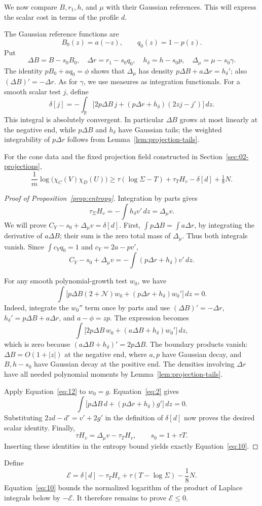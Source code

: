 We now compare $B,r_1,h$, and $\mu$ with their Gaussian references.
This will express the scalar cost in terms of the profile $d$.

The Gaussian reference functions are
\[
B_0(z)=a(-z),\qquad q_0(z)=1-p(z).
\]
Put
\[
\Delta B=B-s_0B_0,\quad \Delta r=r_1-s_0q_0,\quad
h_\delta=h-s_0p,\quad \Delta_\mu=\mu-s_0\gamma.
\]
The identity \(pB_0+aq_0=\phi\) shows that \(\Delta_\mu\) has density \(p\Delta B+a\Delta r=h_\delta'\); also \((\Delta B)'=-\Delta r\). As for \(\gamma\), we use measures as integration functionals. For a smooth scalar test \(j\), define
\[
\delta[j]=-
\int_{\mathbb R}\bigl[2p\Delta B\,j+(p\Delta r+h_\delta)(2zj-j')\bigr]\,dz.
\tag{10}\label{eq:9}
\]
This integral is absolutely convergent. In particular \(\Delta B\) grows at most linearly at the negative end, while \(p\Delta B\) and \(h_\delta\) have Gaussian tails; the weighted integrability of \(p\Delta r\) follows from Lemma~\ref{lem:projection-tails}.

\begin{proposition}\label{prop:entropy}
For the cone data and the fixed projection field constructed in Section~\ref{sec:02-projections},
\[
\frac1m\log\bigl(\chi_C(V)\chi_D(U)\bigr)
\ge \tau(\log\Sigma-T)+\tau_T H_v-\delta[d]+\tfrac18N.
\tag{11}\label{eq:10}
\]
\end{proposition}

\begin{proof}[Proof of Proposition~\ref{prop:entropy}]
Integration by parts gives
\[
\tau_\Sigma H_v=-\int h_\delta v'\,dz=\Delta_\mu v.
\]
We will prove \(C_Y-s_0+\Delta_\mu v=\delta[d]\). First,
\(\int p\Delta B=\int a\Delta r\), by integrating the derivative of \(a\Delta B\); their sum is the zero total mass of \(\Delta_\mu\). Thus both integrals vanish. Since \(\int c_Yq_0=1\) and \(c_Y=2a-pv'\),
\[
C_Y-s_0+\Delta_\mu v=-\int(p\Delta r+h_\delta)v'\,dz.
\]

For any smooth polynomial-growth test \(w_0\), we have
\[
\int\bigl[p\Delta B(2+\mathcal N)w_0
 +(p\Delta r+h_\delta)w_0'\bigr]\,dz=0.
\tag{12}\label{eq:12}
\]
Indeed, integrate the \(w_0''\) term once by parts and use
\((\Delta B)'=-\Delta r\), \(h_\delta'=p\Delta B+a\Delta r\), and \(a-\phi=zp\). The expression becomes
\[
\int\bigl[2p\Delta B\,w_0+(a\Delta B+h_\delta)w_0'\bigr]\,dz,
\]
which is zero because \((a\Delta B+h_\delta)'=2p\Delta B\). The boundary products vanish: \(\Delta B=O(1+|z|)\) at the negative end, where \(a,p\) have Gaussian decay, and \(B,h-s_0\) have Gaussian decay at the positive end. The densities involving \(\Delta r\) have all needed polynomial moments by Lemma~\ref{lem:projection-tails}.

Apply Equation~\eqref{eq:12} to \(w_0=g\). Equation~\eqref{eq:2} gives
\[
\int\bigl[p\Delta B\,d+(p\Delta r+h_\delta)g'\bigr]\,dz=0.
\]
Substituting \(2zd-d'=v'+2g'\) in the definition of \(\delta[d]\) now proves the desired scalar identity. Finally,
\[
\tau H_v=\Delta_\mu v-\tau_T H_v,\qquad s_0=1+\tau T.
\]
Inserting these identities in the entropy bound yields exactly Equation~\eqref{eq:10}.
\end{proof}

Define
\[
 \mathcal E=\delta[d]-\tau_T H_v+\tau(T-\log\Sigma)-\frac18N.
\]
Equation~\eqref{eq:10} bounds the normalized logarithm of the product
of Laplace integrals below by $-\mathcal E$. It therefore remains to
prove $\mathcal E\le0$.
